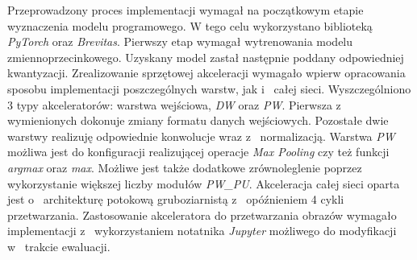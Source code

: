 Przeprowadzony proces implementacji wymagał na początkowym etapie wyznaczenia modelu programowego. 
W tego celu wykorzystano biblioteką \emph{PyTorch} oraz \emph{Brevitas}.
Pierwszy etap wymagał wytrenowania modelu zmiennoprzecinkowego.
Uzyskany model zastał następnie poddany odpowiedniej kwantyzacji.
Zrealizowanie sprzętowej akceleracji wymagało wpierw opracowania sposobu implementacji poszczególnych warstw, jak i~ całej sieci.
Wyszczególniono 3 typy akceleratorów: warstwa wejściowa,  \emph{DW} oraz \emph{PW}.
Pierwsza z~ wymienionych dokonuje zmiany formatu danych wejściowych.
Pozostałe dwie warstwy realizuję odpowiednie konwolucje wraz z~ normalizacją.
Warstwa \emph{PW} możliwa jest do konfiguracji realizującej operacje \emph{Max Pooling} czy też funkcji \emph{argmax} oraz \emph{max}. 
Możliwe jest także dodatkowe zrównoleglenie poprzez wykorzystanie większej liczby modułów \emph{PW\_PU}. 
Akceleracja całej sieci oparta jest o~ architekturę potokową gruboziarnistą z~ opóźnieniem 4 cykli przetwarzania.
Zastosowanie akceleratora do przetwarzania obrazów wymagało implementacji z~ wykorzystaniem notatnika \emph{Jupyter} możliwego do modyfikacji w~ trakcie ewaluacji. 












